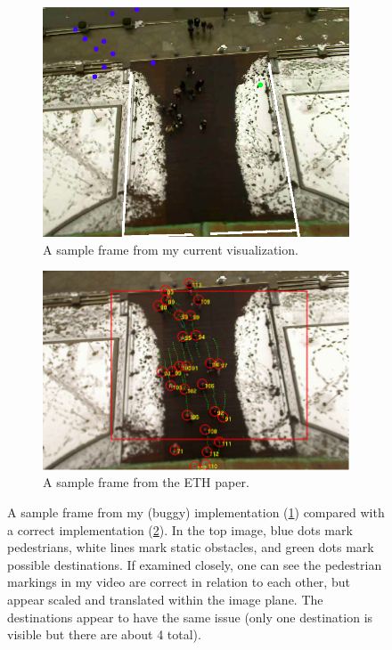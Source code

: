 \documentclass[a4paper,11pt,headings=small]{article}
\begin{document}
\begin{figure}[h]
\centering
\begin{subfigure}[b]{0.8\textwidth}
\centering
\includegraphics[width=\textwidth]{dataset-bug.png}
\caption{A sample frame from my current visualization.}
\label{a}
\end{subfigure}
\begin{subfigure}[b]{0.8\textwidth}
\centering
\includegraphics[width=\textwidth]{dataset-example.png}
\caption{A sample frame from the ETH paper.\cite{Pellegrini2009}}
\label{b}
\end{subfigure}
\caption{A sample frame from my (buggy) implementation (\ref{a}) compared with a correct implementation (\ref{b}). In the top image, blue dots mark pedestrians, white lines mark static obstacles, and green dots mark possible destinations. If examined closely, one can see the pedestrian markings in my video are correct in relation to each other, but appear scaled and translated within the image plane. The destinations appear to have the same issue (only one destination is visible but there are about 4 total).}
\label{bug}
\end{figure}
\end{document}
